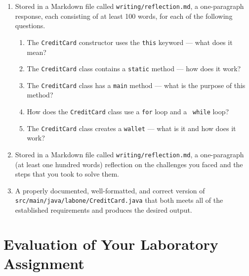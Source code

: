 \documentclass[11pt]{article}
\newcommand{\mainprogramsource}{\lstinline{src/main/java/labone/CreditCard.java}}
\newcommand{\reflection}{\lstinline{writing/reflection.md}}
\begin{document}
\begin{enumerate}

  \setlength{\itemsep}{0in}

\item Stored in a Markdown file called \reflection{}, a one-paragraph response,
  each consisting of at least 100 words, for each of the following questions.

  \vspace*{-.1in}

  \begin{enumerate}
    \itemsep 0em

    \item The {\tt CreditCard} constructor uses the {\tt this} keyword --- what
      does it mean?

    \item The {\tt CreditCard} class contains a {\tt static} method --- how does
      it work?

    \item The {\tt CreditCard} class has a {\tt main} method --- what is the
      purpose of this method?

    \item How does the {\tt CreditCard} class use a {\tt for} loop and a {\tt
      while} loop?

    \item The {\tt CreditCard} class creates a {\tt wallet} --- what is it and
      how does it work?

  \end{enumerate}

\vspace*{-.1in}

\item Stored in a Markdown file called \reflection{}, a one-paragraph (at least
  one hundred words) reflection on the challenges you faced and the steps that
  you took to solve them.

\item A properly documented, well-formatted, and correct version of
  \mainprogramsource{} that both meets all of the established requirements and
  produces the desired output.

\end{enumerate}

\section*{Evaluation of Your Laboratory Assignment}
\end{document}
